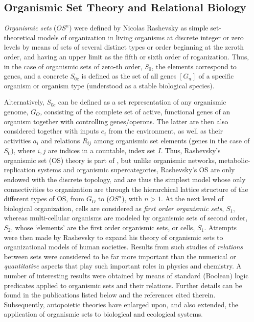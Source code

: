\documentclass[12pt]{article}
\begin{document}
\subsection{Organismic Set Theory and Relational Biology} 

{\em Organismic sets} ($OS^n$) were defined by Nicolas Rashevsky as simple set-theoretical models of organization in living organisms at discrete integer or zero levels by means of sets of several distinct types or order beginning at the zeroth order, and having an upper limit as the fifth or sixth order of roganization. Thus, in the case of organismic sets of zero-th order, $S_0$, the elements correspond to genes, and a concrete $S_{0c}$ is defined as the set of all genes $[G_n]$ of a specific organism or organism type (understood as a stable biological species). 

Alternatively, $S_{0c}$ can be defined as a set representation of any organismic genome, $G_O$, consisting of the complete set of active, functional genes of an organism together with controlling genes/operons. The latter are then also considered together with inputs $e_i$ from the environment, as well as their activities $a_i$ and relations $R_{ij}$ among organismic set elements (genes in the case of $S_0$), where $i, j$ are indices in a countable, index set $I$. Thus, Rashevsky's organismic set (OS) theory is part of , but unlike organismic networks, metabolic-replication systems and organismic supercategories, Rashevsky's OS are only endowed with the discrete topology, and are thus the simplest model whose only connectivities to organization are through the hierarchical lattice structure of the different types of OS, from
$G_O$ to ($OS^n$), with $n>1$.
At the next level of biological organization, cells are  considered as \emph{first order organismic sets}, $S_1$, whereas multi-cellular organisms are modeled by organismic sets of second order, $S_2$, whose `elements' are the first order organismic sets, or cells, $S_1$. Attempts were then made by Rashevsky to expand his theory of organismic sets to organizational models of human societies. Results from such studies of {\em relations} between sets were considered to be far more important than the numerical or {\em quantitative} aspects that play such important roles in physics and chemistry. A number of interesting results were obtained by means of standard (Boolean) logic predicates applied to organismic sets and their relations. Further details can be found in the publications listed below and the references cited therein. Subsequently, autopoietic theories have enlarged upon, and also extended, the application of organismic sets to biological and ecological systems.
\end{document}

